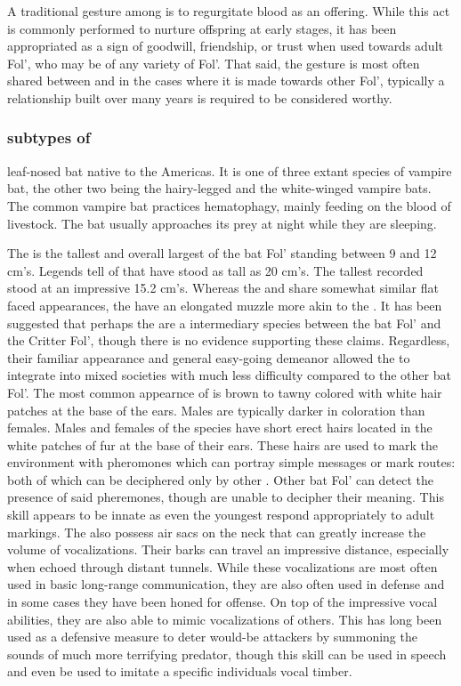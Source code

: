 \documentclass[twoside, 12pt, letterpaper]{report}\usepackage[]{graphicx}\usepackage[]{color}
\begin{document}
\begin{multicols*}{2}
A traditional gesture among \vmbat is to regurgitate blood as an offering. While this act is commonly performed to nurture offspring at early stages, it has been appropriated as a sign of goodwill, friendship, or trust when used towards adult Fol', who may be of any variety of Fol'. That said, the gesture is most often shared between \vmbat and in the cases where it is made towards other Fol', typically a relationship built over many years is required to be considered worthy. 


\subsubsection{subtypes of \vmbat}
leaf-nosed bat native to the Americas. It is one of three extant species of vampire bat, the other two being the hairy-legged and the white-winged vampire bats. The common vampire bat practices hematophagy, mainly feeding on the blood of livestock. The bat usually approaches its prey at night while they are sleeping. 




\nsubsection{\ftbat}
The \ftbat is the tallest and overall largest of the bat Fol' standing between 9 and 12 cm's. Legends tell of \ftbat that have stood as tall as 20 cm's. The tallest recorded \ftbat stood at an impressive 15.2 cm's. Whereas the \hnbat and \vmbat share somewhat similar flat faced appearances, the \ftbat have an elongated muzzle more akin to the \hedgehog. It has been suggested that perhaps the \ftbat are a intermediary species between the bat Fol' and the Critter Fol', though there is no evidence supporting these claims. Regardless, their familiar appearance and general easy-going demeanor allowed the \ftbat to integrate into mixed societies with much less difficulty compared to the other bat Fol'. The most common appearnce of \ftbat is brown to tawny colored with white hair patches at the base of the ears. Males are typically darker in coloration than females. Males and females of the species have short erect hairs located in the white patches of fur at the base of their ears. These hairs are used to mark the environment with pheromones which can portray simple messages or mark routes: both of which can be deciphered only by other \ftbat. Other bat Fol' can detect the presence of said pheremones, though are unable to decipher their meaning. This \ftbat skill appears to be innate as even the youngest \ftbat respond appropriately to adult markings. The \ftbat also possess air sacs on the neck that can greatly increase the volume of vocalizations. Their barks can travel an impressive distance, especially when echoed through distant tunnels. While these vocalizations are most often used in basic long-range communication, they are also often used in defense and in some cases they have been honed for offense. On top of the \ftbat impressive vocal abilities, they are also able to mimic vocalizations of others. This has long been used as a defensive measure to deter would-be attackers by summoning the sounds of much more terrifying predator, though this skill can be used in speech and even be used to imitate a specific individuals vocal timber.


\end{multicols*}
\end{document}
